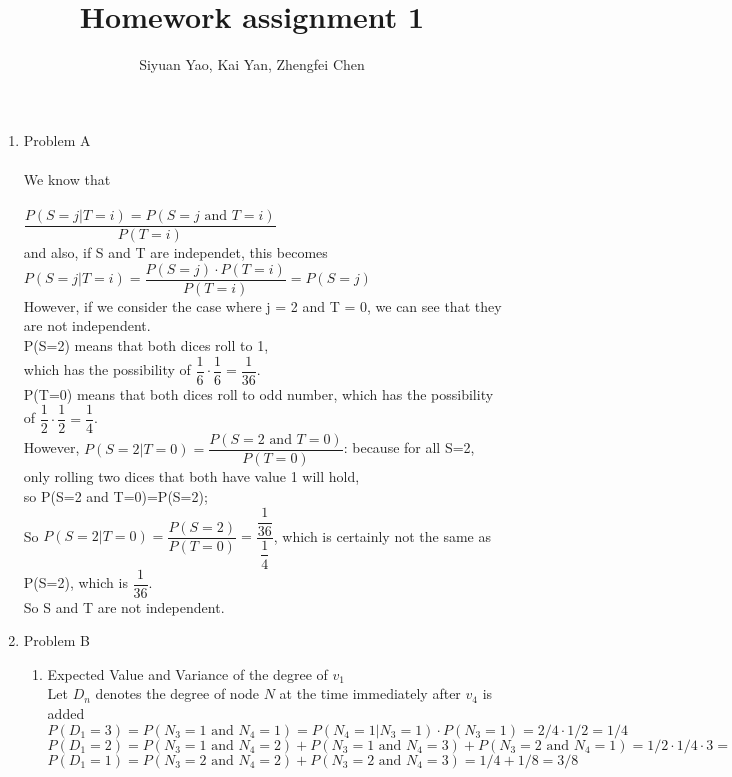\documentclass{amsart}
\begin{document}
\title{Homework assignment 1}
\author{Siyuan Yao, Kai Yan, Zhengfei Chen}
\maketitle

\thispagestyle{empty}
\pagestyle{empty}

\begin{enumerate}
\item Problem A\\\\
We know that\\\\$ \dfrac{P(S=j|T=i) = P(S=j \text{ and } T=i)}{ P(T=i)}$\\ and also, if S and T are independet, this becomes\\ $P(S=j|T=i) = \dfrac{P(S=j)\cdot P(T=i)}{P(T=i)} = P(S=j)$\\
However, if we consider the case where j = 2 and T = 0, we can see that they are not independent.\\
P(S=2) means that both dices roll to 1,\\which has the possibility of $\dfrac{1}{6}\cdot\dfrac{1}{6} = \dfrac{1}{36}$.\\
P(T=0) means that both dices roll to odd number, which has the possibility of $\dfrac{1}{2}\cdot\dfrac{1}{2} = \dfrac{1}{4}$.\\
However, $P(S=2|T=0) = \dfrac{P(S=2 \text{ and } T=0)}{P(T=0)}$: because for all S=2, only rolling two dices that both have value 1 will hold, \\so P(S=2 and T=0)=P(S=2);\\
So $P(S=2|T=0) = \dfrac{P(S=2)}{ P(T=0)} = \dfrac{\dfrac{1}{36}}{\dfrac{1}{4}}$, which is certainly not the same as P(S=2), which is $\dfrac{1}{36}$.\\
So S and T are not independent.
\item Problem B\\
\begin{enumerate}
\item Expected Value and Variance of the degree of $v_1$\\
Let $D_n$ denotes the degree of node $N$ at the time immediately after $v_4$ is added\\
$P(D_1=3) = P(N_3=1 \text{ and } N_4=1) = P(N_4=1 | N_3=1)\cdot P(N_3=1) = 2/4 \cdot 1/2 = 1/4$\\
$P(D_1=2) = P(N_3=1 \text{ and } N_4=2) + P(N_3=1 \text{ and } N_4=3) + P(N_3=2 \text{ and } N_4=1) = 1/2 \cdot 1/4 \cdot 3 = 3/8$\\
$P(D_1=1) = P(N_3=2 \text{ and } N_4=2) + P(N_3=2 \text{ and } N_4=3) = 1/4 + 1/8 = 3/8$\\\\


\end{enumerate}
\end{enumerate}
\end{document}
